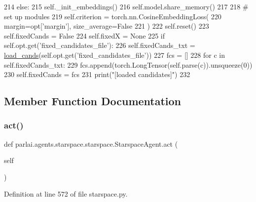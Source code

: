 \begin{DoxyCode}
214             \textcolor{keywordflow}{else}:
215                 self.\_init\_embeddings()
216             self.model.share\_memory()
217 
218         \textcolor{comment}{# set up modules}
219         self.criterion = torch.nn.CosineEmbeddingLoss(
220             margin=opt[\textcolor{stringliteral}{'margin'}], size\_average=\textcolor{keyword}{False}
221         )
222         self.reset()
223         self.fixedCands = \textcolor{keyword}{False}
224         self.fixedX = \textcolor{keywordtype}{None}
225         \textcolor{keywordflow}{if} self.opt.get(\textcolor{stringliteral}{'fixed\_candidates\_file'}):
226             self.fixedCands\_txt = \hyperlink{namespaceparlai_1_1utils_1_1misc_ad935ab0a9d49b897c5e3efdbe1c46c4d}{load\_cands}(self.opt.get(\textcolor{stringliteral}{'fixed\_candidates\_file'}))
227             fcs = []
228             \textcolor{keywordflow}{for} c \textcolor{keywordflow}{in} self.fixedCands\_txt:
229                 fcs.append(torch.LongTensor(self.parse(c)).unsqueeze(0))
230             self.fixedCands = fcs
231             print(\textcolor{stringliteral}{"[loaded candidates]"})
232 
\end{DoxyCode}


\subsection{Member Function Documentation}
\mbox{\label{classparlai_1_1agents_1_1starspace_1_1starspace_1_1StarspaceAgent_aff87fb1b28e798a9ca28a0dc3fbb2f22}} 
\subsubsection{\texorpdfstring{act()}{act()}}
{\footnotesize\ttfamily def parlai.\+agents.\+starspace.\+starspace.\+Starspace\+Agent.\+act (\begin{DoxyParamCaption}\item[{}]{self }\end{DoxyParamCaption})}



Definition at line 572 of file starspace.\+py.


